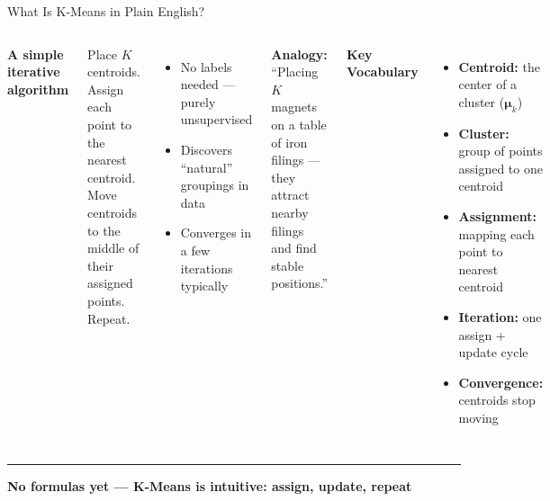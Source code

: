 \documentclass[8pt,aspectratio=169]{beamer}
\newcommand{\bottomnote}[1]{%
\vfill
\vspace{-2mm}
\textcolor{mllavender2}{\rule{\textwidth}{0.4pt}}
\vspace{1mm}
\footnotesize
\textbf{#1}
}
\newenvironment{compactlist}{%
  \begin{itemize}%
    \setlength{\itemsep}{2pt}%
    \setlength{\parskip}{0pt}%
    \setlength{\parsep}{0pt}%
}{%
  \end{itemize}%
}
\newcommand{\highlight}[1]{\textcolor{mlorange}{\textbf{#1}}}
\begin{document}
\begin{frame}[t]{What Is K-Means in Plain English?}
\begin{columns}[T]
\small
\textbf{A simple iterative algorithm}

\footnotesize
Place $K$ centroids. Assign each point to the nearest centroid. Move centroids to the middle of their assigned points. Repeat.
\begin{compactlist}
\item \footnotesize No labels needed --- purely unsupervised
\item \footnotesize Discovers ``natural'' groupings in data
\item \footnotesize Converges in a few iterations typically
\end{compactlist}

\vspace{2mm}
\highlight{Analogy:} ``Placing $K$ magnets on a table of iron filings --- they attract nearby filings and find stable positions.''

\vspace{2mm}
\footnotesize
\textbf{Key Vocabulary}
\begin{compactlist}
\item \footnotesize \textbf{Centroid:} the center of a cluster ($\boldsymbol{\mu}_k$)
\item \footnotesize \textbf{Cluster:} group of points assigned to one centroid
\item \footnotesize \textbf{Assignment:} mapping each point to nearest centroid
\item \footnotesize \textbf{Iteration:} one assign + update cycle
\item \footnotesize \textbf{Convergence:} centroids stop moving
\end{compactlist}
\end{columns}
\bottomnote{No formulas yet --- K-Means is intuitive: assign, update, repeat}
\end{frame}
\end{document}

